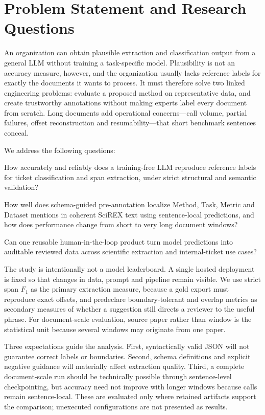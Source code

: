 \section{Problem Statement and Research Questions}
\label{sec:problem}

An organization can obtain plausible extraction and classification output from
a general LLM without training a task-specific model. Plausibility is not an
accuracy measure, however, and the organization usually lacks reference labels
for exactly the documents it wants to process. It must therefore solve two
linked engineering problems: evaluate a proposed method on representative
data, and create trustworthy annotations without making experts label every
document from scratch. Long documents add operational concerns---call volume,
partial failures, offset reconstruction and resumability---that short benchmark
sentences conceal.

We address the following questions:

\begin{description}[leftmargin=1.7cm, style=nextline, font=\bfseries, itemsep=1pt]
    \item[RQ1] How accurately and reliably does a training-free LLM reproduce
        reference labels for ticket classification and span extraction, under
        strict structural and semantic validation?
    \item[RQ2] How well does schema-guided pre-annotation localize Method,
        Task, Metric and Dataset mentions in coherent SciREX text using
        sentence-local predictions, and how does performance change from short
        to very long document windows?
    \item[RQ3] Can one reusable human-in-the-loop product turn model
        predictions into auditable reviewed data across scientific extraction
        and internal-ticket use cases?
\end{description}

The study is intentionally not a model leaderboard. A single hosted deployment
is fixed so that changes in data, prompt and pipeline remain visible. We use
strict span $F_1$ as the primary extraction measure, because a gold export must
reproduce exact offsets, and predeclare boundary-tolerant and overlap metrics as
secondary measures of whether a suggestion still directs a reviewer to the
useful phrase. For document-scale evaluation, source paper rather than window is
the statistical unit because several windows may originate from one paper.

Three expectations guide the analysis. First, syntactically valid JSON will not
guarantee correct labels or boundaries. Second, schema definitions and explicit
negative guidance will materially affect extraction quality. Third, a complete
document-scale run should be technically possible through sentence-level
checkpointing, but accuracy need not improve with longer windows because calls
remain sentence-local. These are evaluated only where retained artifacts support
the comparison; unexecuted configurations are not presented as results.
